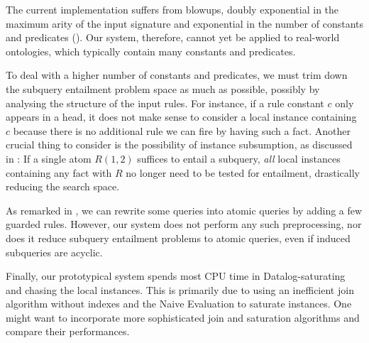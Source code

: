 \documentclass[12pt]{report}
\theoremstyle{plain}
\theoremstyle{definition}
\begin{document}
The current implementation suffers from blowups, doubly exponential in the maximum arity of the input signature and exponential in the number of constants and predicates (). Our system, therefore, cannot yet be applied to real-world ontologies, which typically contain many constants and predicates.

To deal with a higher number of constants and predicates, we must trim down the subquery entailment problem space as much as possible, possibly by analysing the structure of the input rules. For instance, if a rule constant $c$ only appears in a head, it does not make sense to consider a local instance containing $c$ because there is no additional rule we can fire by having such a fact. Another crucial thing to consider is the possibility of instance subsumption, as discussed in : If a single atom $R(1, 2)$ suffices to entail a subquery, \emph{all} local instances containing any fact with $R$ no longer need to be tested for entailment, drastically reducing the search space.

As remarked in , we can rewrite some queries into atomic queries by adding a few guarded rules. However, our system does not perform any such preprocessing, nor does it reduce subquery entailment problems to atomic queries, even if induced subqueries are acyclic.

Finally, our prototypical system spends most CPU time in Datalog-saturating and chasing the local instances. This is primarily due to using an inefficient join algorithm without indexes and the Naive Evaluation to saturate instances. One might want to incorporate more sophisticated join and saturation algorithms and compare their performances.

\printbibliography
\end{document}
